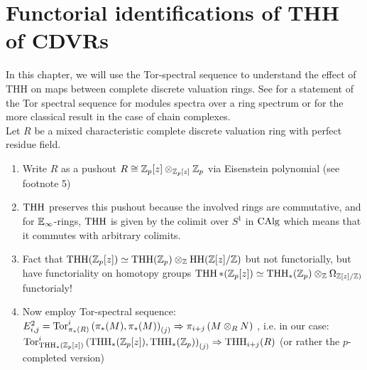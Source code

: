 \chapter{Functorial identifications of THH of CDVRs}
In this chapter, we will use the Tor-spectral sequence to understand the effect of THH on maps between complete discrete valuation rings.
See \cite[~Proposition 7.2.1.19]{lurie2017higher} for a statement of the Tor spectral sequence for modules spectra over a ring spectrum 
or \cite[\href{https://stacks.math.columbia.edu/tag/061Y}{Tag 061Y}]{stacks-project} for the more classical result in the case of chain complexes.
\\
Let $R$ be a mixed characteristic complete discrete valuation ring with perfect residue field.
\begin{enumerate}
    \item Write $R$ as a pushout $R\cong\mathbb{Z}_p[z]\otimes_{\mathbb{Z}_p[z]}\mathbb{Z}_p$ via Eisenstein polynomial (see footnote 5)
    \item $\operatorname{THH}$ preserves this pushout because the involved rings are commutative, and for $\mathbb{E}_\infty$-rings, $\operatorname{THH}$ is given by the colimit over $S^1$ in $\operatorname{CAlg}$ which means that it commutes with arbitrary colimits.
    \item Fact that $\operatorname{THH}(\mathbb{Z}_p[z])\simeq \operatorname{THH}(\mathbb{Z}_p)\otimes_{\mathbb{Z}} \operatorname{HH}(\mathbb{Z}[z]/\mathbb{Z})$ but not functorially, but have functoriality on homotopy groups
    $\operatorname{THH}*(\mathbb{Z}_p[z])\simeq \operatorname{THH}_*(\mathbb{Z}_p)\otimes_{\mathbb{Z}} \Omega_{\mathbb{Z}[z]/\mathbb{Z})}$ functorialy!
    \item Now employ Tor-spectral sequence:\\
     $E^2_{i,j}=\operatorname{Tor}_{\pi_*(R)}^i\left( \pi_*(M), \pi_*(M)\right)_{(j)}\Rightarrow \pi_{i+j}\left( M\otimes_R N \right)$
    , i.e. in our case: 
    \\
    $\operatorname{Tor}_{\operatorname{THH}_*(\mathbb{Z}_p[z])}^i\left( \operatorname{THH}_*(\mathbb{Z}_p[z]),\operatorname{THH}_*(\mathbb{Z}_p)\right)_{(j)}\Rightarrow \operatorname{THH}_{i+j}(R)$ (or rather the $p$-completed version)

\end{enumerate}
